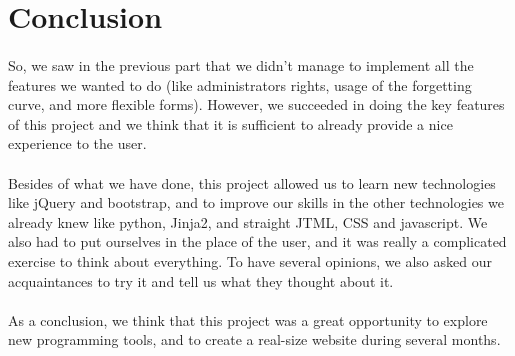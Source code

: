 \section{Conclusion} %

\paragraph{}

So, we saw in the previous part that we didn't manage to implement all the features we wanted to do (like administrators rights, usage of the forgetting curve, and more flexible forms). However, we succeeded in doing the key features of this project and we think that it is sufficient to already provide a nice experience to the user. 

\paragraph{}
Besides of what we have done, this project allowed us to learn new technologies like jQuery and bootstrap, and to improve our skills in the other technologies we already knew like python, Jinja2, and straight JTML, CSS and javascript. We also had to put ourselves in the place of the user, and it was really a complicated exercise to think about everything. To have several opinions, we also asked our acquaintances to try it and tell us what they thought about it. 

\paragraph{}
As a conclusion, we think that this project was a great opportunity to explore new programming tools, and to create a real-size website during several months.